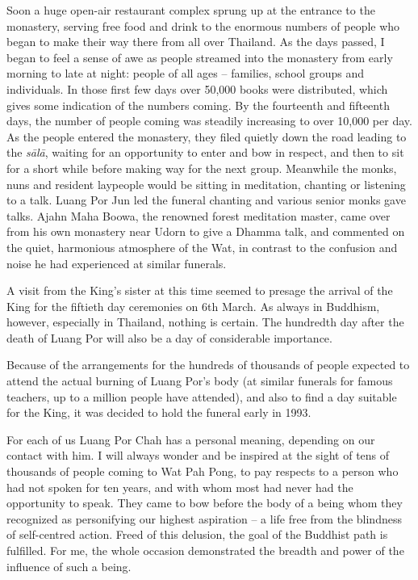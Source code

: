 Soon a huge open-air restaurant complex sprung up at the entrance to the
monastery, serving free food and drink to the enormous numbers of people
who began to make their way there from all over Thailand. As the days
passed, I began to feel a sense of awe as people streamed into the
monastery from early morning to late at night: people of all ages --
families, school groups and individuals. In those first few days over
50,000 books were distributed, which gives some indication of the
numbers coming. By the fourteenth and fifteenth days, the number of
people coming was steadily increasing to over 10,000 per day. As the
people entered the monastery, they filed quietly down the road leading
to the \emph{sālā}, waiting for an opportunity to enter and bow in
respect, and then to sit for a short while before making way for the
next group. Meanwhile the monks, nuns and resident laypeople would be
sitting in meditation, chanting or listening to a talk. Luang Por Jun
led the funeral chanting and various senior monks gave talks. Ajahn Maha
Boowa, the renowned forest meditation master, came over from his own
monastery near Udorn to give a Dhamma talk, and commented on the quiet, 
harmonious atmosphere of the Wat, in contrast to the confusion and noise
he had experienced at similar funerals. 

A visit from the King's sister at this time seemed to presage the
arrival of the King for the fiftieth day ceremonies on 6th March. As
always in Buddhism, however, especially in Thailand, nothing is certain. 
The hundredth day after the death of Luang Por will also be a day of
considerable importance. 

Because of the arrangements for the hundreds of thousands of people
expected to attend the actual burning of Luang Por's body (at similar
funerals for famous teachers, up to a million people have attended), and
also to find a day suitable for the King, it was decided to hold the
funeral early in 1993. 

For each of us Luang Por Chah has a personal meaning, depending on our
contact with him. I will always wonder and be inspired at the sight of
tens of thousands of people coming to Wat Pah Pong, to pay respects to a
person who had not spoken for ten years, and with whom most had never
had the opportunity to speak. They came to bow before the body of a
being whom they recognized as personifying our highest aspiration -- a
life free from the blindness of self-centred action. Freed of this
delusion, the goal of the Buddhist path is fulfilled. For me, the whole
occasion demonstrated the breadth and power of the influence of such a
being. 

